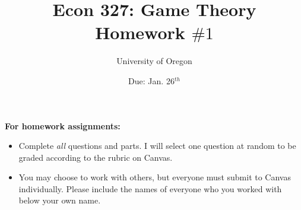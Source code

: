 \documentclass[addpoints, answers]{exam}
\title{
    \textbf{Econ 327: Game Theory} \\ 
    Homework $\#1$
    }
\author{University of Oregon}
\date{Due: Jan. 26$^{th}$}
\begin{document}
\maketitle

\begin{center}
  \gradetable[h][questions]
\end{center}

\vspace{0.5in}

\begin{center}
  \textbf{For homework assignments:}
\end{center}

\begin{itemize}


  \item Complete \textit{all} questions and parts.
  I will select one question at random to be graded
  according to the rubric on Canvas.

  \item You may choose to work with others,
  but everyone must submit to Canvas individually.
  Please include the names of everyone who you worked with 
  below your own name.
 
\end{itemize}

\vspace{1.0in}


\vspace{0.5in}


\newpage
\end{document}
